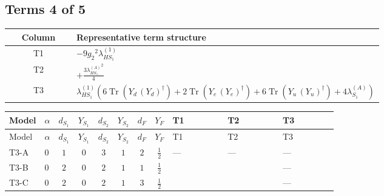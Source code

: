 \documentclass[8pt]{article}
\begin{document}
\begin{landscape}
\subsection*{Terms 4 of 5}
\begin{center}
\begin{tabular}{@{}c >{\raggedright\arraybackslash}p{0.82\linewidth}@{}}
\toprule
Column & Representative term structure \\
\midrule
T1 & \(\displaystyle -9 {g_2}^2 {\lambda_{HS_1}^{(1)}}\) \\
\midrule
T2 & \(\displaystyle +\frac{3 {\lambda_{HS_1}^{(A)}}^2}{4}\) \\
\midrule
T3 & \(\displaystyle {\lambda_{HS_1}^{(1)}} (6 \operatorname{Tr}\!\left({Y_d}\,\left({Y_d}\right)^{\dagger}\right)+2 \operatorname{Tr}\!\left({Y_e}\,\left({Y_e}\right)^{\dagger}\right)+6 \operatorname{Tr}\!\left({Y_u}\,\left({Y_u}\right)^{\dagger}\right)+4 {\lambda_{S_1}^{(A)}})\) \\
\midrule
\bottomrule
\end{tabular}
\end{center}
\smallskip
\tiny
\begin{longtable}{@{}llcccccc >{\raggedright\arraybackslash}p{0.21\linewidth} >{\raggedright\arraybackslash}p{0.21\linewidth} >{\raggedright\arraybackslash}p{0.21\linewidth}@{}}
\toprule
Model & $\alpha$ & $d_{S_1}$ & $Y_{S_1}$ & $d_{S_2}$ & $Y_{S_2}$ & $d_F$ & $Y_F$ & T1 & T2 & T3 \\
\midrule
\endfirsthead
\toprule
Model & $\alpha$ & $d_{S_1}$ & $Y_{S_1}$ & $d_{S_2}$ & $Y_{S_2}$ & $d_F$ & $Y_F$ & T1 & T2 & T3 \\
\midrule
\endhead
T3-A & $0$ & $1$ & $0$ & $3$ & $1$ & $2$ & $\frac{1}{2}$ & --- & --- & --- \\
\midrule
T3-B & $0$ & $2$ & $0$ & $2$ & $1$ & $1$ & $\frac{1}{2}$ & \scriptsize\adjustbox{max width=\linewidth}{$\begin{gathered} -9 {g_2}^2 {\lambda_{HS_1}^{(1)}}\end{gathered}$} & \scriptsize\adjustbox{max width=\linewidth}{$\begin{gathered} +\frac{3 {\lambda_{HS_1}^{(A)}}^2}{4}\end{gathered}$} & --- \\
\midrule
T3-C & $0$ & $2$ & $0$ & $2$ & $1$ & $3$ & $\frac{1}{2}$ & \scriptsize\adjustbox{max width=\linewidth}{$\begin{gathered} -9 {g_2}^2 {\lambda_{HS_1}^{(1)}}\end{gathered}$} & \scriptsize\adjustbox{max width=\linewidth}{$\begin{gathered} +\frac{3 {\lambda_{HS_1}^{(A)}}^2}{4}\end{gathered}$} & --- \\

\end{longtable}
\end{landscape}
\end{document}
